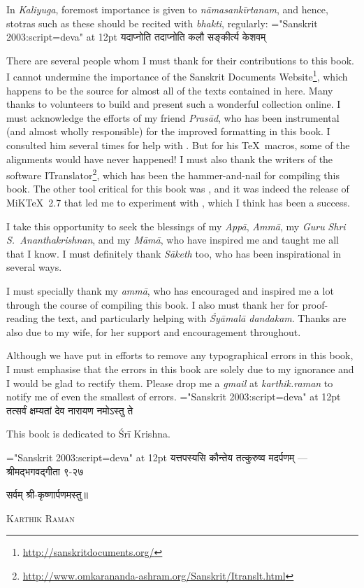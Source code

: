 \noindent In \textit{Kaliyuga}, foremost importance is given to \textit{nāmasankīrtanam}, and hence, stotras such as these should be recited with \textit{bhakti}, regularly:
{\font \x="Sanskrit 2003:script=deva" at 12pt\x
{}
{यदाप्नोति तदाप्नोति कलौ सङ्कीर्त्य केशवम्}
}

There are several people whom I must thank for their contributions to this book. I cannot undermine the importance of the Sanskrit Documents Website\footnote{\scriptsize \url{http://sanskritdocuments.org/}}, which happens to be the source for almost all of the texts contained in here. Many thanks to volunteers to build and present such a wonderful collection online.
\thispagestyle{fancy}
I must acknowledge the efforts of my friend \textit{Prasād}, who has been instrumental (and almost wholly responsible) for the improved formatting in this book. I consulted him several times for help with \XeLaTeX. But for his \TeX\ macros, some of the alignments would have never happened! I must also thank the writers of the software ITranslator\footnote{\scriptsize \url{http://www.omkarananda-ashram.org/Sanskrit/Itranslt.html}}, which has been the hammer-and-nail for compiling this book. The other tool critical for this book was \XeLaTeX, and it was indeed the release of MiK\TeX\ 2.7 that led me to experiment with \XeLaTeX, which I think has been a success.

I take this opportunity to seek the blessings of my \textit{Appā}, \textit{Ammā}, my \textit{Guru} \textit{Shri S.~Ananthakrishnan}, and my \textit{Māmā}, who have inspired me and taught me all that I know. I must definitely thank \textit{Sāketh} too, who has been inspirational in several ways.

I must specially thank my \textit{ammā}, who has encouraged and inspired me a lot through the course of compiling this book. I also must thank her for proof-reading the text, and particularly helping with \textit{Śyāmalā dandakam}. Thanks are also due to my wife, for her support and encouragement throughout.

Although we have put in efforts to remove any typographical errors in this book, I must emphasise that the errors in this book are solely due to my ignorance and I would be glad to rectify them. Please drop me a \textit{gmail} at \textit{karthik.raman} to notify me of even the smallest of errors.
\thispagestyle{fancy}
{\font \x="Sanskrit 2003:script=deva" at 12pt\x
{}
{तत्सर्वं क्षम्यतां देव नारायण नमोऽस्तु ते}
}

This book is dedicated to Śrī Krishna.
{\font \x="Sanskrit 2003:script=deva" at 12pt\x
{}
{यत्तपस्यसि कौन्तेय तत्कुरुष्व मदर्पणम्}
\hfill — श्रीमद्भगवद्गीता ९-२७
\centerline{सर्वम् श्री-कृष्णार्पणमस्तु॥}
}

\medskip
{} \hfill \textsc{Karthik Raman}

